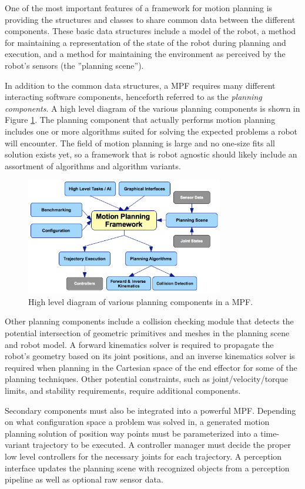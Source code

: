 \documentclass[10pt,journal,compsoc]{joser1}
\begin{document}
{One of the most important features of a framework for motion planning is providing the structures and classes to share common data between the different components. These basic data structures include a model of the robot, a method for maintaining a representation of the state of the robot during planning and execution, and a method for maintaining the environment as perceived by the robot's sensors (the ''planning scene'').

In addition to the common data structures, a MPF requires many different interacting software components, henceforth referred to as the \textit{planning components}. A high level diagram of the various planning components is shown in Figure \ref{fig:motionplanning_highlevel}. The planning component that actually performs motion planning includes one or more algorithms suited for solving the expected problems a robot will encounter. The field of motion planning is large and no one-size fits all solution exists yet, so a framework that is robot agnostic should likely include an assortment of algorithms and algorithm variants.

\begin{figure}[!t]
\centering
\includegraphics[width=3.4in]{images/motionplanning_highlevel}
\caption{High level diagram of various planning components in a MPF.}
\label{fig:motionplanning_highlevel}
\end{figure} 

Other planning components include a collision checking module that detects the potential intersection of geometric primitives and meshes in the planning scene and robot model. A forward kinematics solver is required to propagate the robot's geometry based on its joint positions, and an inverse kinematics solver is required when planning in the Cartesian space of the end effector for some of the planning techniques. Other potential constraints, such as joint/velocity/torque limits, and stability requirements, require additional components.

Secondary components must also be integrated into a powerful MPF. Depending on what configuration space a problem was solved in, a generated motion planning solution of position way points must be parameterized into a time-variant trajectory to be executed. A controller manager must decide the proper low level controllers for the necessary joints for each trajectory. A perception interface updates the planning scene with recognized objects from a perception pipeline as well as optional raw sensor data.

}
\end{document}
